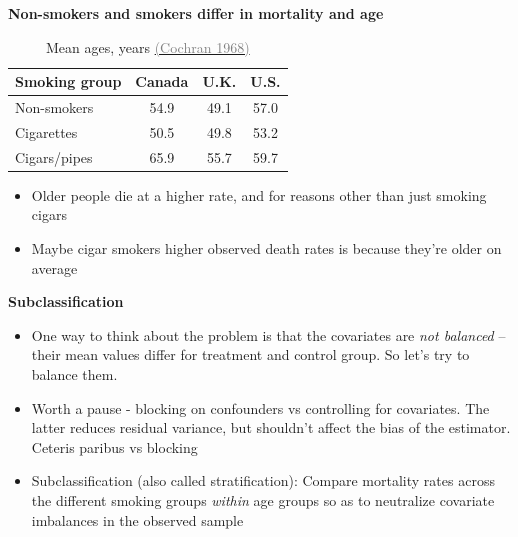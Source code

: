 \documentclass[notes=show]{beamer}
\newcommand{\myurlshort}[2]{\href{#1}{\textcolor{gray}{\textsf{#2}}}}
\begin{document}
\begin{frame}[plain]
	\begin{center}
	\textbf{Non-smokers and smokers differ in mortality and age}
	\end{center}
	


	\begin{table}\centering
		\caption{Mean ages, years \myurlshort{http://psycnet.apa.org/psycinfo/1968-16440-001}{(Cochran 1968)}}
		\begin{center}
		\begin{tabular}{lccc}
		\hline \hline
		\multicolumn{1}{l}{Smoking group}&
		\multicolumn{1}{c}{Canada}&
		\multicolumn{1}{c}{U.K.}&
		\multicolumn{1}{c}{U.S.}\\
		\hline
		Non-smokers & 54.9 & 49.1 & 57.0\\
		Cigarettes & 50.5 & 49.8 & 53.2 \\
		Cigars/pipes & 65.9 & 55.7 & 59.7\\
		\hline
		\end{tabular}
		\end{center}
	\end{table}
	
	\begin{itemize}
	\item Older people die at a higher rate, and for reasons other than just smoking cigars
	\item Maybe cigar smokers higher observed death rates is because they're older on average
	\end{itemize}
 

\end{frame}

\begin{frame}[plain]
	\begin{center}
	\textbf{Subclassification}
	\end{center}
	
	\begin{itemize}
	\item One way to think about the problem is that the covariates are \emph{not balanced} -- their mean values differ for treatment and control group.  So let's try to balance them.
	\item Worth a pause - blocking on confounders vs controlling for covariates. The latter reduces residual variance, but shouldn't affect the bias of the estimator. Ceteris paribus vs blocking
	\item Subclassification (also called stratification):  Compare mortality rates across the different smoking groups \emph{within} age groups so as to neutralize covariate imbalances in the observed sample
	\end{itemize}
\end{frame}
\end{document}
